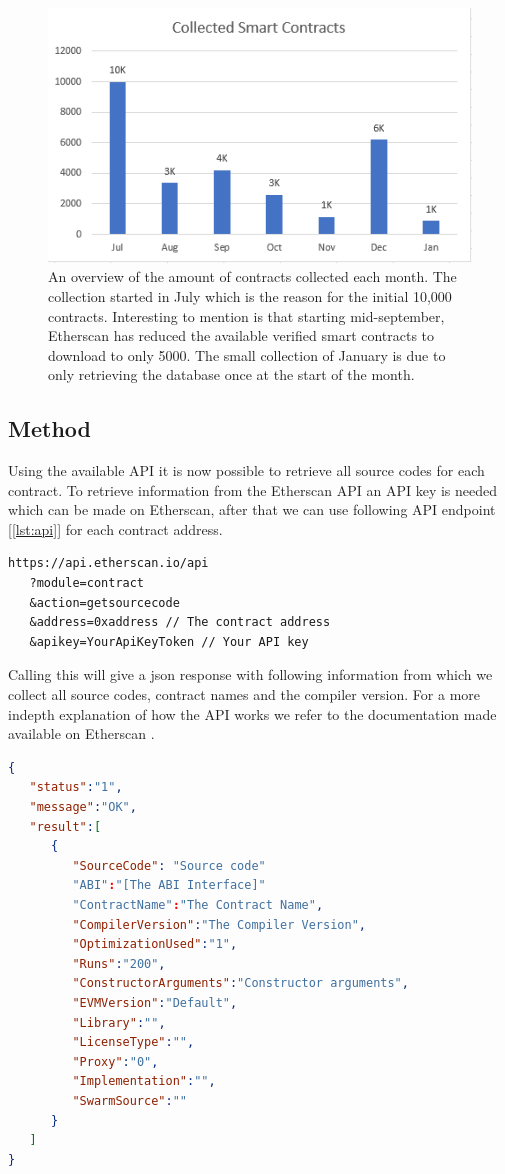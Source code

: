 \documentclass[sigconf]{acmart}
\begin{document}
\begin{figure}[h]
  \centering
  \includegraphics[width=\linewidth]{img/barchart_dates_v2.PNG}
  \caption{An overview of the amount of contracts collected each month. The collection started in July which is the reason for the initial 10,000 contracts. Interesting to mention is that starting mid-september, Etherscan has reduced the available verified smart contracts to download to only 5000. The small collection of January is due to only retrieving the database once at the start of the month.}
  \label{fig:database}
\end{figure}
\subsection{Method}
Using the available API it is now possible to retrieve all source codes for each contract. To retrieve information from the Etherscan API an API key is needed which can be made on Etherscan, after that we can use following API endpoint  [\ref{lst:api}] for each contract address. 

\begin{lstlisting}[language=Solidity, caption=Api call, label={lst:api}]
https://api.etherscan.io/api
   ?module=contract
   &action=getsourcecode
   &address=0xaddress // The contract address
   &apikey=YourApiKeyToken // Your API key
\end{lstlisting}

Calling this will give a json response with following information from which
we collect all source codes, contract names and the compiler version. For a more indepth explanation of how the API works we refer to the documentation made available on Etherscan \cite{etherscan_api}. 
\begin{lstlisting}[language=json,firstnumber=1]
{
   "status":"1",
   "message":"OK",
   "result":[
      {
         "SourceCode": "Source code"
         "ABI":"[The ABI Interface]"
         "ContractName":"The Contract Name",
         "CompilerVersion":"The Compiler Version",
         "OptimizationUsed":"1",
         "Runs":"200",
         "ConstructorArguments":"Constructor arguments",
         "EVMVersion":"Default",
         "Library":"",
         "LicenseType":"",
         "Proxy":"0",
         "Implementation":"",
         "SwarmSource":""
      }
   ]
}
\end{lstlisting}
\end{document}
